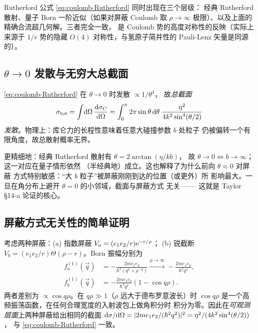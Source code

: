 \begin{remark}[惊人巧合]
Rutherford 公式 \eqref{eq:coulomb-Rutherford} 同时出现在三个层级：
经典 Rutherford 散射、量子 Born 一阶近似（如果对屏蔽 Coulomb 取
$\rho\to\infty$ 极限）、以及上面的精确合流超几何解。三者完全一致，
是 Coulomb 势的高度对称性的反映（实际上来源于 $1/r$ 势的隐藏
$O(4)$ 对称性，与氢原子简并性的 Pauli-Lenz 矢量是同源的）。
\end{remark}

\subsection{$\theta\to 0$ 发散与无穷大总截面}

\eqref{eq:coulomb-Rutherford} 在 $\theta\to 0$ 时发散 $\propto 1/\theta^4$，
故\emph{总截面}
\begin{equation}
  \sigma_{\mathrm{tot}}=\int\!\mathrm{d}\Omega\,\frac{\mathrm{d}\sigma_C}{\mathrm{d}\Omega}
  =\int_0^\pi 2\pi\sin\theta\,\mathrm{d}\theta\;\frac{\eta^2}{4k^2\sin^4(\theta/2)}
\end{equation}
\emph{发散}。物理上：库仑力的长程性意味着任意大碰撞参数 $b$ 处粒子
仍被偏转一个有限角度，故总散射概率无界。

更精细地：经典 Rutherford 散射有 $\theta=2\arctan(\eta/kb)$，
故 $\theta\to 0\Leftrightarrow b\to\infty$；这一对应在量子情形依然
（半经典地）成立。这也解释了为什么前向 $\theta\approx 0$ 对屏蔽
方式特别敏感：``大 $b$ 粒子''被屏蔽刚刚到达的位置（或更外）所
影响最大。一旦在角分布上避开 $\theta=0$ 的小邻域，截面与屏蔽方式
无关 —— 这就是 Taylor §14-a 论证的核心。

\subsection{屏蔽方式无关性的简单证明}

考虑两种屏蔽：(a) 指数屏蔽 $V_a=(e_1 e_2/r)\mathrm{e}^{-r/\rho}$；
(b) 锐截断 $V_b=(e_1 e_2/r)\Theta(\rho-r)$。Born 振幅分别为
\begin{align}
  f^{(1)}_a(\vec q)&=-\frac{2m e_1 e_2}{\hbar^2(q^2+\rho^{-2})}\xrightarrow{\rho\to\infty}-\frac{2m e_1 e_2}{\hbar^2 q^2},\\
  f^{(1)}_b(\vec q)&=-\frac{2m e_1 e_2}{\hbar^2 q^2}(1-\cos q\rho).
\end{align}
两者差别为 $\propto\cos q\rho$。在 $q\rho\gg 1$（$\rho$ 远大于德布罗意波长）时
$\cos q\rho$ 是一个高频振荡函数，在任何合理宽度的入射波包上做角积分时
积分为零。因此在\emph{可观测层面}上两种屏蔽给出相同的截面 $\mathrm{d}\sigma/\mathrm{d}\Omega
=|2me_1e_2/(\hbar^2 q^2)|^2=\eta^2/(4k^2\sin^4(\theta/2))$，
与 \eqref{eq:coulomb-Rutherford} 一致。

